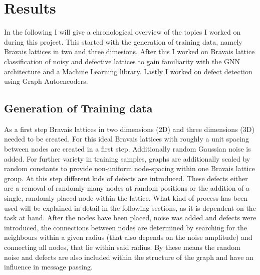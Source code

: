 \documentclass[11pt,a4paper]{article}
\begin{document}

\section{Results}
\label{sec:Results}
In the following I will give a chronological overview of the topics I worked on during this project. 
This started with the generation of training data, namely Bravais lattices in two and three dimesions. After this I worked on Bravais lattice classification of noisy and defective lattices to gain familiarity with the GNN architecture and a Machine Learning library. Lastly I worked on defect detection using Graph Autoencoders. 

\subsection{Generation of Training data}
\label{ssec:Generation of training data}
As a first step Bravais lattices in two dimensions (2D) and three dimensions (3D) needed to be created. 
For this ideal Bravais lattices with roughly a unit spacing between nodes are created in a first step. 
Additionally random Gaussian noise is added. 
For further variety in training samples, graphs are additionally scaled by random constants to provide non-uniform node-spacing within one Bravais lattice group. 
At this step different kids of defects are introduced. 
These defects either are a removal of randomly many nodes at random positions or the addition of a single, randomly placed node within the lattice. 
What kind of process has been used will be explained in detail in the following sections, as it is dependent on the task at hand. 
After the nodes have been placed, noise was added and defects were introduced, the connections between nodes are determined by searching for the neighbours within a given radius (that also depends on the noise amplitude) and connecting all nodes, that lie within said radius. 
By these means the random noise and defects are also included within the structure of the graph and have an influence in message passing. \\
\end{document}
